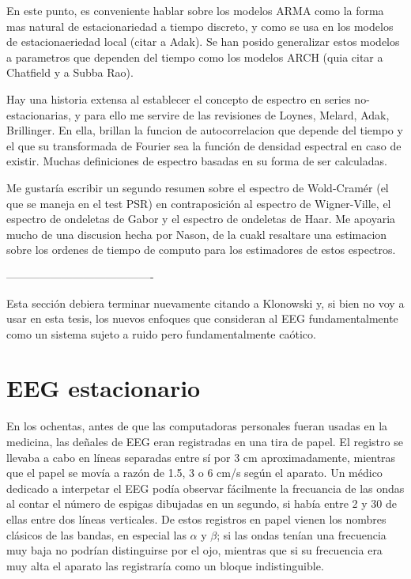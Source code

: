 En este punto, es conveniente hablar sobre los modelos ARMA como la forma mas natural de
estacionariedad a tiempo discreto, y como se usa en los modelos de estacionaeriedad 
local (citar a Adak). Se han posido generalizar estos modelos a parametros que
dependen del tiempo como los modelos ARCH (quia citar a Chatfield y a Subba Rao).

Hay una historia extensa al establecer el concepto de espectro en series no-estacionarias,
y para ello me servire de las revisiones de Loynes, Melard, Adak, Brillinger. En ella,
brillan la funcion de autocorrelacion que depende del tiempo y el que su transformada
de Fourier sea la funci\'on de densidad espectral en caso de existir. Muchas
definiciones de espectro basadas en su forma de ser calculadas.

Me gustar\'ia escribir un segundo resumen sobre el espectro de Wold-Cram\'er (el que se maneja
en el test PSR) en contraposici\'on al espectro de Wigner-Ville, el espectro de
ondeletas de Gabor y el espectro de ondeletas de Haar. Me apoyaria mucho de una discusion
hecha por Nason, de la cuakl resaltare una estimacion sobre los ordenes de tiempo de
computo para los estimadores de estos espectros.

----------------------------------------

Esta secci\'on debiera terminar nuevamente citando a Klonowski y, 
si bien no voy a usar en esta tesis, los
nuevos enfoques que consideran al EEG fundamentalmente como un sistema sujeto a ruido pero
fundamentalmente ca\'otico.


\section{EEG estacionario}

En los ochentas, antes de que las computadoras personales fueran usadas en la medicina, las
de\~nales de EEG eran registradas en una tira de papel. El registro se llevaba a cabo
en l\'ineas separadas entre s\'i por 3 cm aproximadamente, mientras que el papel se mov\'ia a 
raz\'on de 1.5, 3 o 6 cm/s seg\'un el aparato. Un m\'edico dedicado a interpetar el EEG pod\'ia
observar f\'acilmente la frecuancia de las ondas al contar el n\'umero de espigas dibujadas
en un segundo, si hab\'ia entre 2 y 30 de ellas entre dos l\'ineas verticales. De estos registros
en papel vienen los nombres cl\'asicos de las bandas, en especial las $\alpha$ y $\beta$; si las
ondas ten\'ian una frecuencia muy baja no podr\'ian distinguirse por el ojo, 
mientras que si su frecuencia era muy alta el aparato las registrar\'ia como un bloque 
indistinguible\cite{klonowski09}.

